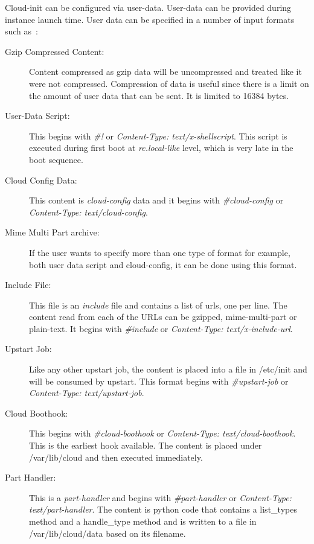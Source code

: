 Cloud-init can be configured via user-data. User-data can be provided during
instance launch time. User data can be specified in a number of input formats
such as~\cite{hid-sp18-516-www-cloud-init}:

\begin{description}
   \item[Gzip Compressed Content:] Content compressed as gzip data will be
   uncompressed and treated like it were not compressed. Compression of data 
   is useful since there is a limit on the amount of user data that can be 
   sent. It is limited to 16384 bytes. 
   \item[User-Data Script:] This begins with \textit{#!} or
   \textit{Content-Type: text/x-shellscript}. This script is executed during 
   first boot at \textit{rc.local-like} level, which is very late in the boot 
   sequence. 
   \item[Cloud Config Data:] This content is \textit{cloud-config} data and it
   begins with \textit{#cloud-config} or 
   \textit{Content-Type: text/cloud-config}. 
   \item[Mime Multi Part archive:] If the user wants to specify more than one
   type of format for example, both user data script and cloud-config, it can 
   be done using this format. 
   \item[Include File:] This file is an \textit{include} file and contains a
   list of urls, one per line. The content read from each of the URLs can be
   gzipped, mime-multi-part or plain-text. It begins with \textit{#include} or
   \textit{Content-Type: text/x-include-url}. 
   \item[Upstart Job:] Like any other upstart job, the content is placed into a
   file in /etc/init and will be consumed by upstart. This format begins with
   \textit{#upstart-job} or \textit{Content-Type: text/upstart-job}. 
   \item[Cloud Boothook:] This begins with \textit{#cloud-boothook} or
   \textit{Content-Type: text/cloud-boothook}. This is the earliest hook 
   available. The content is placed under /var/lib/cloud and then executed 
   immediately. 
   \item[Part Handler:] This is a \textit{part-handler} and begins with
   \textit{#part-handler} or \textit{Content-Type: text/part-handler}. The 
   content is python code that contains a list\_types method and a 
   handle\_type method and is written to a file in /var/lib/cloud/data 
   based on its filename. 
\end{description}

